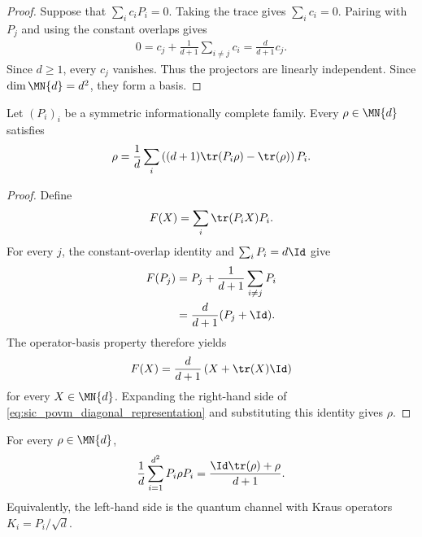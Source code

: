 \begin{proof}\leanok
    Suppose that $\sum_i c_iP_i=0$. Taking the trace gives
    $\sum_i c_i=0$. Pairing with $P_j$ and using the constant overlaps gives
    \begin{align}
        0=c_j+\frac1{d+1}\sum_{i\ne j}c_i
        =\frac d{d+1}c_j.
    \end{align}
    Since $d\ge1$, every $c_j$ vanishes. Thus the projectors are linearly
    independent. Since $\dim\MN{d}=d^2$, they form a basis.
\end{proof}

\begin{theorem}
    \label{thm:sic_povm_diagonal_representation}
    \leanok
    Let $(P_i)_i$ be a symmetric informationally complete family. Every
    $\rho\in\MN{d}$ satisfies
    \begin{align}
        \rho=\frac1d\sum_i
        \left((d+1)\tr(P_i\rho)-\tr(\rho)\right)P_i.
        \label{eq:sic_povm_diagonal_representation}
    \end{align}
\end{theorem}

\begin{proof}\leanok
    Define
    \begin{align}
        F(X)=\sum_i\tr(P_iX)P_i.
    \end{align}
    For every $j$, the constant-overlap identity and $\sum_iP_i=d\Id$ give
    \begin{align}
        F(P_j)
         & =P_j+\frac1{d+1}\sum_{i\ne j}P_i \\
         & =\frac{d}{d+1}(P_j+\Id).
    \end{align}
    The operator-basis property therefore yields
    \begin{align}
        F(X)=\frac{d}{d+1}\left(X+\tr(X)\Id\right)
    \end{align}
    for every $X\in\MN{d}$. Expanding the right-hand side of
    \eqref{eq:sic_povm_diagonal_representation} and substituting this identity
    gives $\rho$.
\end{proof}

\begin{theorem}
    \label{thm:sic_povm_kraus_channel}
    \leanok
    For every $\rho\in\MN{d}$,
    \begin{align}
        \frac1d\sum_{i=1}^{d^2}P_i\rho P_i
        =\frac{\Id\tr(\rho)+\rho}{d+1}.
        \label{eq:sic_povm_kraus_channel}
    \end{align}
    Equivalently, the left-hand side is the quantum channel with Kraus
    operators $K_i=P_i/\sqrt d$.
\end{theorem}


